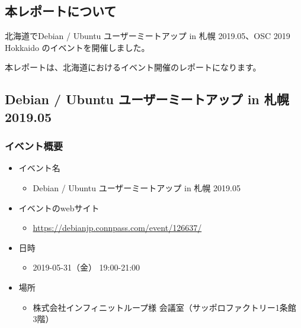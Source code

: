 \documentclass[mingoth,a4paper]{jsarticle}
\begin{document}
\subsection{本レポートについて}

北海道でDebian / Ubuntu ユーザーミートアップ in 札幌 2019.05、OSC 2019 Hokkaido のイベントを開催しました。

本レポートは、北海道におけるイベント開催のレポートになります。


\subsection{Debian / Ubuntu ユーザーミートアップ in 札幌 2019.05}


\subsubsection{イベント概要}

\begin{itemize}
\item イベント名
  \begin{itemize}
  \item Debian / Ubuntu ユーザーミートアップ in 札幌 2019.05
  \end{itemize}
\end{itemize}

\begin{itemize}
\item イベントのwebサイト
  \begin{itemize}
  \item \url{https://debianjp.connpass.com/event/126637/}
  \end{itemize}
\end{itemize}

\begin{itemize}
\item 日時
  \begin{itemize}
  \item 2019-05-31（金） 19:00-21:00
  \end{itemize}
\end{itemize}

\begin{itemize}
\item 場所
  \begin{itemize}
  \item 株式会社インフィニットループ様 会議室（サッポロファクトリー1条館　3階）
  \end{itemize}
\end{itemize}
\end{document}
